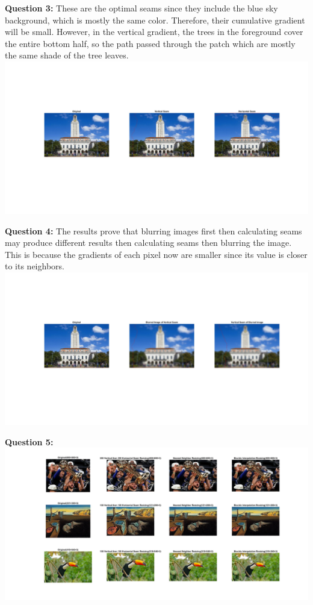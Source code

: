 \documentclass[11pt]{article}
\begin{document}
    \textbf{Question 3:}\newline
    These are the optimal seams since they include the blue sky background,
    which is mostly the same color. Therefore, their cumulative gradient will
    be small. However, in the vertical gradient, the trees in the foreground
    cover the entire bottom half, so the path passed through the patch which
    are mostly the same shade of the tree leaves.\newline
    \includegraphics[width=\linewidth]{Part 2 Pictures/question3}\newline

    \textbf{Question 4:}\newline
    The results prove that blurring images first then calculating seams may
    produce different results then calculating seams then blurring the image.
    This is because the gradients of each pixel now are smaller since its
    value is closer to its neighbors.\newline
    \includegraphics[width=\linewidth]{Part 2 Pictures/question4}\newline

    \textbf{Question 5:}\newline
    \includegraphics[width=\linewidth]{Part 2 Pictures/question5}\newline
\end{document}

